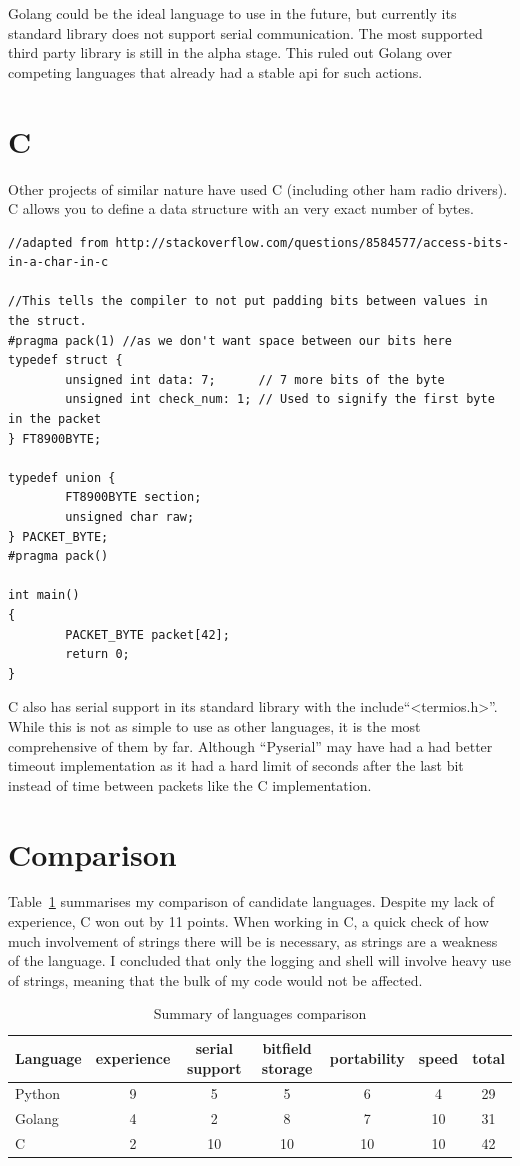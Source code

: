 Golang could be the ideal language to use in the future, but currently its standard library does not support serial communication. The most supported third party library is still in the alpha stage. This ruled out Golang over competing languages that already had a stable \gls{api} for such actions.

\section*{C}
Other projects of similar nature have used C (including other ham radio drivers). C allows you to define a data structure with an very exact number of bytes.

\begin{verbatim}
//adapted from http://stackoverflow.com/questions/8584577/access-bits-in-a-char-in-c

//This tells the compiler to not put padding bits between values in the struct.
#pragma pack(1) //as we don't want space between our bits here
typedef struct {
        unsigned int data: 7;      // 7 more bits of the byte
        unsigned int check_num: 1; // Used to signify the first byte in the packet
} FT8900BYTE;

typedef union { 
        FT8900BYTE section;
        unsigned char raw;
} PACKET_BYTE;
#pragma pack()

int main()
{
        PACKET_BYTE packet[42];
        return 0;
}
\end{verbatim}

C also has serial support in its standard library with the include``<termios.h>''. While this is not as simple to use as other languages, it is the most comprehensive of them by far. Although ``Pyserial'' may have had a had better timeout implementation as it had a hard limit of seconds after the last bit instead of time between packets like the C implementation.

\section*{Comparison}
Table~\ref{table:language_comparison} summarises my comparison of candidate languages. Despite my lack of experience, C won out by 11 points. When working in C, a quick check of how much involvement of strings there will be is necessary, as strings are a weakness of the language. I concluded that only the logging and shell will involve heavy use of strings, meaning that the bulk of my code would not be affected.

\begin{table}[h!]
\centering
\begin{tabular}{|l| c c c c c |c|} 
 \hline
 Language & experience & serial support & bitfield storage & portability & speed & total\\
 \hline\hline
  Python & 9 & 5 & 5 & 6 & 4 & 29 \\
 \hline
 Golang  & 4 &  2 &  8 &  7 & 10 & 31\\
 \hline
 C       & 2 & 10 & 10 & 10 & 10 & 42\\
\hline
\end{tabular}
\caption{Summary of languages comparison}
\label{table:language_comparison}
\end{table}


